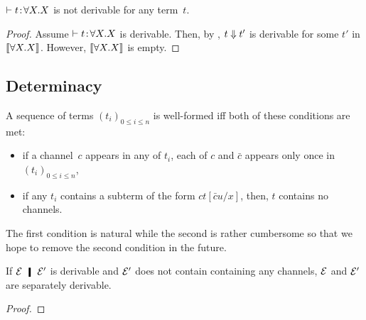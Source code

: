    \begin{corollary}
    $\vdash{t} \mathord{\colon\kern -2pt}{\forall X.X}$ is not derivable for any term~$t$.
   \end{corollary}
    \begin{proof}
     Assume $\vdash{t} \mathord{\colon\kern -2pt}{\forall X.X}$ is derivable.
     Then, by ,
     $t\Downarrow t'$ is derivable for some $t'$ in $\llbracket{\forall X.X}\rrbracket$.
     However, $\llbracket{\forall X.X}\rrbracket$ is empty.
    \end{proof}

    \subsection{Determinacy}

    A sequence of terms $(t_i)_{0\le i \le n}$ is well-formed iff both
    of these conditions are met:
    \begin{itemize}
     \item if a channel~$c$ appears in any of $t_i$,
	   each of $c$ and $\bar c$ appears only once in $(t_i)_{0\le i
	   \le n}$,
     \item if any $t_i$ contains a subterm of the form $ct[\bar cu/x]$,
	   then, $t$ contains no channels.
    \end{itemize}
    The first condition is natural while the second is rather
    cumbersome so that we hope to remove the second condition in the
    future.

    \begin{proposition}
     \label{remove-local}
     If $\hypere\hmid \hypere'$ is derivable and $\mathcal{E}'$ does not contain
     containing any channels, $\mathcal{E}$ and $\mathcal{E}'$ are separately derivable.
    \end{proposition}
    \begin{proof}
    \end{proof}

